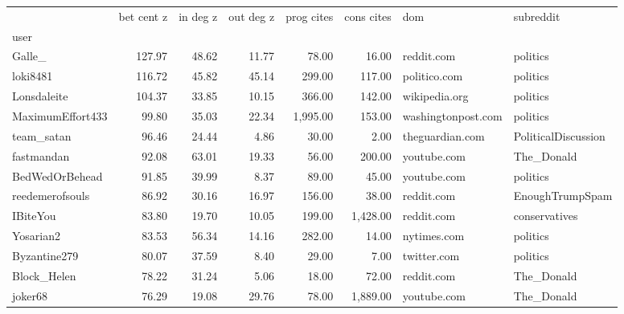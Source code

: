 \begin{tabular}{lrrrrrll}
\toprule
{} &  bet cent z &  in deg z &  out deg z &  prog cites &  cons cites &                    dom &            subreddit \\
user             &             &           &            &             &             &                        &                      \\
\midrule
Galle\_           &      127.97 &     48.62 &      11.77 &       78.00 &       16.00 &             reddit.com &             politics \\
loki8481         &      116.72 &     45.82 &      45.14 &      299.00 &      117.00 &           politico.com &             politics \\
Lonsdaleite      &      104.37 &     33.85 &      10.15 &      366.00 &      142.00 &          wikipedia.org &             politics \\
MaximumEffort433 &       99.80 &     35.03 &      22.34 &    1,995.00 &      153.00 &     washingtonpost.com &             politics \\
team\_satan       &       96.46 &     24.44 &       4.86 &       30.00 &        2.00 &        theguardian.com &  PoliticalDiscussion \\
fastmandan       &       92.08 &     63.01 &      19.33 &       56.00 &      200.00 &            youtube.com &           The\_Donald \\
BedWedOrBehead   &       91.85 &     39.99 &       8.37 &       89.00 &       45.00 &            youtube.com &             politics \\
reedemerofsouls  &       86.92 &     30.16 &      16.97 &      156.00 &       38.00 &             reddit.com &      EnoughTrumpSpam \\
IBiteYou         &       83.80 &     19.70 &      10.05 &      199.00 &    1,428.00 &             reddit.com &        conservatives \\
Yosarian2        &       83.53 &     56.34 &      14.16 &      282.00 &       14.00 &            nytimes.com &             politics \\
Byzantine279     &       80.07 &     37.59 &       8.40 &       29.00 &        7.00 &            twitter.com &             politics \\
Block\_Helen      &       78.22 &     31.24 &       5.06 &       18.00 &       72.00 &             reddit.com &           The\_Donald \\
joker68          &       76.29 &     19.08 &      29.76 &       78.00 &    1,889.00 &            youtube.com &           The\_Donald \\

\end{tabular}
